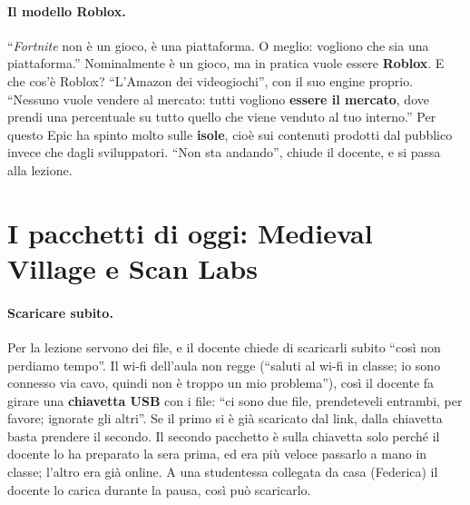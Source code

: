 \paragraph{Il modello Roblox.} ``\emph{Fortnite} non è un gioco, è una
piattaforma. O meglio: vogliono che sia una piattaforma.'' Nominalmente è un
gioco, ma in pratica vuole essere \textbf{Roblox}. E che cos'è Roblox? ``L'Amazon
dei videogiochi'', con il suo engine proprio. ``Nessuno vuole vendere al mercato:
tutti vogliono \textbf{essere il mercato}, dove prendi una percentuale su tutto
quello che viene venduto al tuo interno.'' Per questo Epic ha spinto molto sulle
\textbf{isole}, cioè sui contenuti prodotti dal pubblico invece che dagli
sviluppatori. ``Non sta andando'', chiude il docente, e si passa alla lezione.

\section{I pacchetti di oggi: Medieval Village e Scan Labs}
\label{gd14:sec:pacchetti}

\paragraph{Scaricare subito.} Per la lezione servono dei file, e il docente chiede
di scaricarli subito ``così non perdiamo tempo''. Il wi-fi dell'aula non regge
(``saluti al wi-fi in classe; io sono connesso via cavo, quindi non è troppo un mio
problema''), così il docente fa girare una \textbf{chiavetta USB} con i file:
``ci sono due file, prendeteveli entrambi, per favore; ignorate gli altri''. Se
il primo si è già scaricato dal link, dalla chiavetta basta prendere il secondo.
Il secondo pacchetto è sulla chiavetta solo perché il docente lo ha preparato la
sera prima, ed era più veloce passarlo a mano in classe; l'altro era già online.
A una studentessa collegata da casa (Federica) il docente lo carica durante la
pausa, così può scaricarlo.

